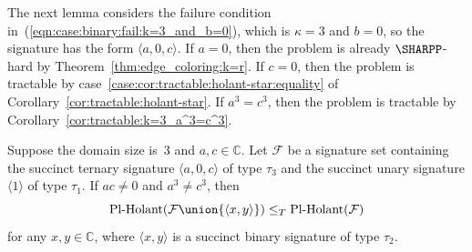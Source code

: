 \documentclass[11pt]{article}
\newcommand{\PlHolant}{\operatorname{Pl-Holant}}
\begin{document}
The next lemma considers the failure condition in~(\ref{eqn:case:binary:fail:k=3_and_b=0}),
which is $\kappa = 3$ and $b = 0$,
so the signature has the form $\langle a,0,c \rangle$.
If $a = 0$,
then the problem is already $\SHARPP$-hard by Theorem~\ref{thm:edge_coloring:k=r}.
If $c = 0$,
then the problem is tractable by case~\ref{case:cor:tractable:holant-star:equality} of Corollary~\ref{cor:tractable:holant-star}.
If $a^3 = c^3$,
then the problem is tractable by Corollary~\ref{cor:tractable:k=3_a^3=c^3}.

\begin{lemma} \label{lem:binary:k=3_and_b=0}
 Suppose the domain size is~$3$ and $a, c \in \mathbb{C}$.
 Let $\mathcal{F}$ be a signature set containing the succinct ternary signature $\langle a,0,c \rangle$ of type $\tau_3$
 and the succinct unary signature $\langle 1 \rangle$ of type $\tau_1$.
 If $a c \ne 0$ and $a^3 \ne c^3$,
 then
 \[
  \PlHolant(\mathcal{F} \union \{\langle x,y \rangle\}) \le_T \PlHolant(\mathcal{F})
 \]
 for any $x,y \in \mathbb{C}$,
 where $\langle x,y \rangle$ is a succinct binary signature of type $\tau_2$.
\end{lemma}
\end{document}
